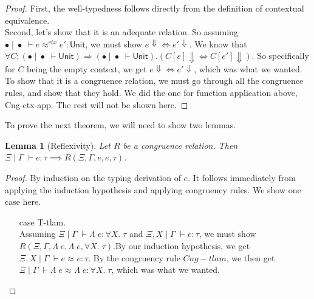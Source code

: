 \documentclass[twoside,11pt,openright]{report}
\newtheorem{lemma}[theorem]{Lemma}
\theoremstyle{definition}
\newcommand{\expr}{e}
\newcommand{\Tvar}{X}
\newcommand{\Tlam}{\Lambda\;}
\newcommand{\ctx}{C}
\newcommand{\Tunit}{\mathsf{Unit}}
\newcommand{\Tall}[2]{\forall #1.\; #2}
\newcommand{\typ}{\tau}
\newcommand{\venv}{\Gamma}
\newcommand{\tenv}{\Xi}
\newcommand{\empvenv}{\bullet}
\newcommand{\emptenv}{\bullet}
\newcommand{\jdg}[4]{#1 \; | \; #2 \; \vdash #3 : #4}
\newcommand{\jdgType}[3]{#1 \; | \; #2 \; \vdash #3}
\newcommand{\jdgRel}[6]{#1 \; | \; #2 \; \vdash #3 \approx^{#4} #5 : #6}
\newcommand{\ctxRel}[5]{\jdgRel{#1}{#2}{#3}{ctx}{#4}{#5}}
\begin{document}
\begin{proof}
  First, the well-typedness follows directly from the definition of contextual equivalence.\\
  Second, let's show that it is an adequate relation. So assuming $\ctxRel{\empvenv}{\emptenv}{\expr}{\expr'}{\Tunit}$, we must show $\expr \Downarrow \iff \expr' \Downarrow$. We know that $\forall \ctx : (\jdgType{\emptenv}{\empvenv}{\Tunit}) \Rightarrow (\jdgType{\emptenv}{\empvenv}{\Tunit}) . (\ctx[\expr] \Downarrow \iff \ctx[\expr'] \Downarrow)$. So specifically for $C$ being the empty context, we get $\expr \Downarrow \iff \expr' \Downarrow$, which was what we wanted.\\
  To show that it is a congruence relation, we must go through all the congruence rules, and show that they hold. We did the one for function application above, Cng-ctx-app. The rest will not be shown here.
\end{proof}

To prove the next theorem, we will need to show two lemmas.
\begin{lemma}[Reflexivity]\label{lem:R_Cng_is_reflexive}
  Let $R$ be a congruence relation. Then $\jdg{\tenv}{\venv}{\expr}{\typ} \implies R(\tenv, \venv, \expr, \expr, \typ)$.
\end{lemma}
\begin{proof}
  By induction on the typing derivation of $\expr$. It follows immediately from applying the induction hypothesis and applying congruency rules. We show one case here.
  \begin{itemize}
    \item[case] T-tlam.\\
      Assuming $\jdg{\tenv}{\venv}{\Tlam \expr}{\Tall{\Tvar}{\typ}}$ and $\jdg{\tenv, \Tvar}{\venv}{\expr}{\typ}$, we must show $R(\tenv, \venv, \Tlam \expr, \Tlam \expr, \Tall{\Tvar}{\typ})$.By our induction hypothesis, we get $\jdgRel{\tenv, \Tvar}{\venv}{\expr}{}{\expr}{\typ}$. By the congruency rule $Cng-tlam$, we then get $\jdgRel{\tenv}{\venv}{\Tlam \expr}{}{\Tlam \expr}{\Tall{\Tvar}{\typ}}$, which was what we wanted.
  \end{itemize}
\end{proof}
\end{document}
